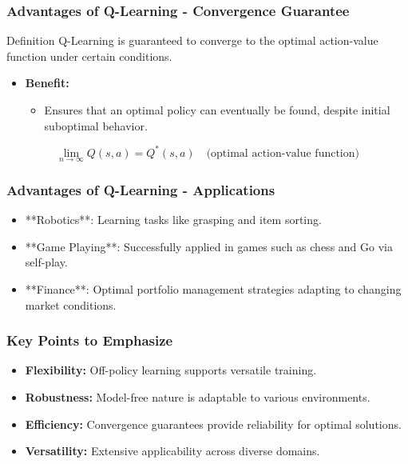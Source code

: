 \documentclass[aspectratio=169]{beamer}
\begin{document}
\begin{frame}[fragile]
    \frametitle{Advantages of Q-Learning - Convergence Guarantee}
    \begin{block}{Definition}
    Q-Learning is guaranteed to converge to the optimal action-value function under certain conditions.
    \end{block}
    \begin{itemize}
        \item \textbf{Benefit:}
        \begin{itemize}
            \item Ensures that an optimal policy can eventually be found, despite initial suboptimal behavior.
        \end{itemize}
    \end{itemize}
    \begin{equation}
    \lim_{n \to \infty} Q(s, a) = Q^*(s, a) \quad \text{(optimal action-value function)}
    \end{equation}
\end{frame}

\begin{frame}[fragile]
    \frametitle{Advantages of Q-Learning - Applications}
    \begin{itemize}
        \item **Robotics**: Learning tasks like grasping and item sorting.
        \item **Game Playing**: Successfully applied in games such as chess and Go via self-play.
        \item **Finance**: Optimal portfolio management strategies adapting to changing market conditions.
    \end{itemize}
\end{frame}

\begin{frame}[fragile]
    \frametitle{Key Points to Emphasize}
    \begin{itemize}
        \item \textbf{Flexibility:} Off-policy learning supports versatile training.
        \item \textbf{Robustness:} Model-free nature is adaptable to various environments.
        \item \textbf{Efficiency:} Convergence guarantees provide reliability for optimal solutions.
        \item \textbf{Versatility:} Extensive applicability across diverse domains.
    \end{itemize}
\end{frame}
\end{document}
